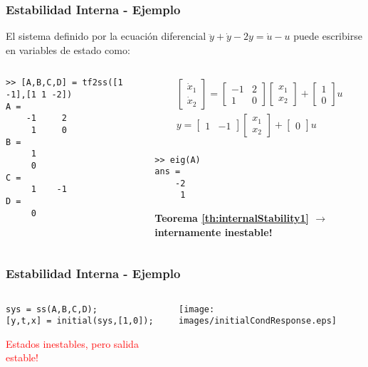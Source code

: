 \documentclass[aspectratio=169,handout]{beamer}
\theoremstyle{definition}
\theoremstyle{plain}
\theoremstyle{remark}
\begin{document}
\begin{frame}[<+->][fragile]\frametitle{Estabilidad Interna - Ejemplo}
El sistema definido por la ecuación diferencial $\ddot{y} + \dot{y} - 2y = \dot{u} - u$ puede escribirse en variables de estado como:
\begin{columns}
\begin{column}{0.5\textwidth}
\scriptsize
\begin{verbatim}
>> [A,B,C,D] = tf2ss([1 -1],[1 1 -2])
A =
    -1     2
     1     0
B =
     1
     0
C =
     1    -1
D =
     0
\end{verbatim} 
\end{column}	
\begin{column}{0.5\textwidth}
\begin{align*}
\begin{bmatrix}
	\dot{x}_1 \\ \dot{x}_2
\end{bmatrix} = 
\begin{bmatrix}
	-1 & 2 \\ 1 & 0
\end{bmatrix}
\begin{bmatrix}
	x_1 \\ x_2
\end{bmatrix} + 
\begin{bmatrix}
	1 \\ 0
\end{bmatrix}u\\
y =
\begin{bmatrix}
	1 & -1
\end{bmatrix}
\begin{bmatrix}
	x_1 \\ x_2
\end{bmatrix} + 
\begin{bmatrix}
	0
\end{bmatrix}u\\
\end{align*}
\vspace*{-1.5cm}
\small
\begin{verbatim}
>> eig(A)
ans =
    -2
     1	
\end{verbatim}
\textbf{Teorema \ref{th:internalStability1} $\rightarrow$ internamente inestable!}
\end{column}	
\end{columns}
\end{frame}

\begin{frame}[<+->][fragile]\frametitle{Estabilidad Interna - Ejemplo}
\vspace*{5mm}
\begin{columns}
\begin{column}{0.4\textwidth}
\small
\begin{verbatim}
sys = ss(A,B,C,D);
[y,t,x] = initial(sys,[1,0]);
\end{verbatim}
\textcolor{red}{Estados inestables, pero salida estable!} 
\end{column}	
\begin{column}{0.6\textwidth}
\centering
\texttt{[image: images/initialCondResponse.eps]}
\end{column}	
\end{columns}
\end{frame}
\end{document}
